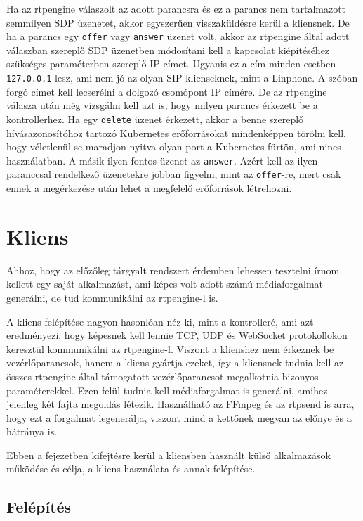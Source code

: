 Ha az rtpengine válaszolt az adott parancsra és ez a parancs nem tartalmazott semmilyen 
SDP üzenetet, akkor egyszerűen visszaküldésre kerül a kliensnek. De ha a parancs egy 
\texttt{offer} vagy \texttt{answer} üzenet volt, akkor az rtpengine által adott válaszban 
szereplő SDP üzenetben módosítani kell a kapcsolat kiépítéséhez szükséges paraméterben 
szereplő IP címet. Ugyanis ez a cím minden esetben \texttt{127.0.0.1} lesz, ami nem jó az 
olyan SIP klienseknek, mint a Linphone. A szóban forgó címet kell lecserélni a dolgozó 
csomópont IP címére. De az rtpengine válasza után még vizsgálni kell azt is, hogy milyen 
parancs érkezett be a kontrollerhez. Ha egy \texttt{delete} üzenet érkezett, akkor a 
benne szereplő hívásazonosítóhoz tartozó Kubernetes erőforrásokat mindenképpen törölni 
kell, hogy véletlenül se maradjon nyitva olyan port a Kubernetes fürtön, ami nincs 
használatban. A másik ilyen fontos üzenet az \texttt{answer}. Azért kell az ilyen 
paranccsal rendelkező üzenetekre jobban figyelni, mint az \texttt{offer}-re, mert csak 
ennek a megérkezése után lehet a megfelelő erőforrások létrehozni.

\section{Kliens}

Ahhoz, hogy az előzőleg tárgyalt rendszert érdemben lehessen tesztelni írnom kellett egy 
saját alkalmazást, ami képes volt adott számú médiaforgalmat generálni, de tud 
kommunikálni az rtpengine-l is.

A kliens felépítése nagyon hasonlóan néz ki, mint a kontrolleré, ami azt eredményezi, 
hogy képesnek kell lennie  TCP, UDP és WebSocket protokollokon keresztül kommunikálni az 
rtpengine-l. Viszont a klienshez nem érkeznek be vezérlőparancsok, hanem a kliens gyártja 
ezeket, így a kliensnek tudnia kell az összes rtpengine által támogatott vezérlőparancsot 
megalkotnia bizonyos paraméterekkel. Ezen felül tudnia kell médiaforgalmat is generálni, 
amihez jelenleg két fajta megoldás létezik. Használható az FFmpeg és az rtpsend is arra, 
hogy ezt a forgalmat legenerálja, viszont mind a kettőnek megvan az előnye és a hátránya 
is. 

Ebben a fejezetben kifejtésre kerül a kliensben használt külső alkalmazások működése és 
célja, a kliens használata és annak felépítése.  

\subsection{Felépítés}

